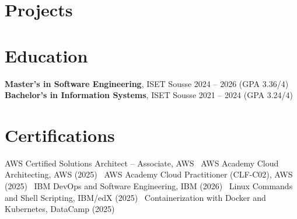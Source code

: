 \documentclass[a4paper,10pt]{article}
\begin{document}
\section*{Projects}
\pBackup
\pWeatherETL
\pKube
\pOpenShift
\pAWSNet

\section*{Education}
\textbf{Master's in Software Engineering}, ISET Sousse \hfill 2024 -- 2026 (GPA 3.36/4)\\
\textbf{Bachelor's in Information Systems}, ISET Sousse \hfill 2021 -- 2024 (GPA 3.24/4)

\section*{Certifications}
AWS Certified Solutions Architect -- Associate, AWS \textbar\ AWS Academy Cloud Architecting, AWS (2025) \textbar\ AWS Academy Cloud Practitioner (CLF-C02), AWS (2025) \textbar\ IBM DevOps and Software Engineering, IBM (2026) \textbar\ Linux Commands and Shell Scripting, IBM/edX (2025) \textbar\ Containerization with Docker and Kubernetes, DataCamp (2025)
\end{document}
